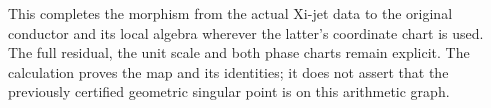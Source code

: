 This completes the morphism from the actual Xi-jet data to the
original conductor and its local algebra wherever the latter's
coordinate chart is used.  The full residual, the unit scale and
both phase charts remain explicit.  The calculation proves the
map and its identities; it does not assert that the previously
certified geometric singular point is on this arithmetic graph.
